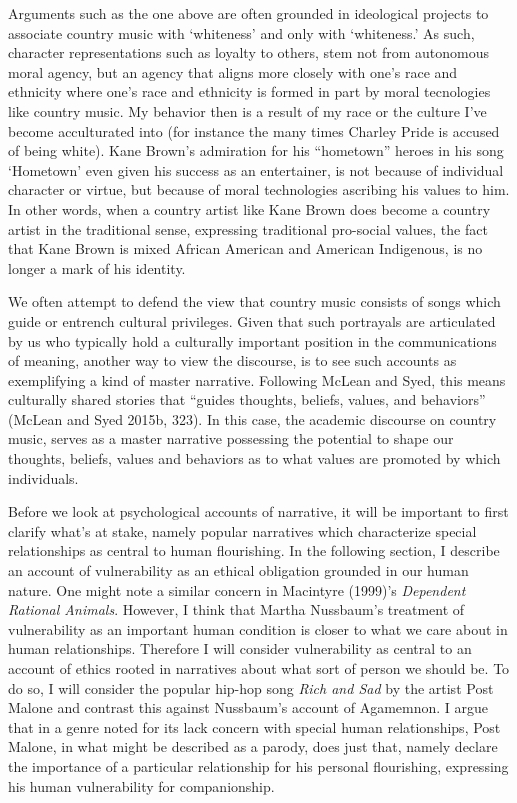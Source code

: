 \documentclass[12pt]{book}
\theoremstyle{definition}
\theoremstyle{remark}
\begin{document}
Arguments such as the one above are often grounded in ideological projects to associate country music with `whiteness' and only with `whiteness.' As such, character representations such as loyalty to others, stem not from autonomous moral agency, but an agency that aligns more closely with one's race and ethnicity where one's race and ethnicity is formed in part by moral tecnologies like country music. My behavior then is a result of my race or the culture I've become acculturated into (for instance the many times Charley Pride is accused of being white). Kane Brown's admiration for his ``hometown'' heroes in his song `Hometown' even given his success as an entertainer, is not because of individual character or virtue, but because of moral technologies ascribing his values to him. In other words, when a country artist like Kane Brown does become a country artist in the traditional sense, expressing traditional pro-social values, the fact that Kane Brown is mixed African American and American Indigenous, is no longer a mark of his identity.

We often attempt to defend the view that country music consists of songs which guide or entrench cultural privileges. Given that such portrayals are articulated by us who typically hold a culturally important position in the communications of meaning, another way to view the discourse, is to see such accounts as exemplifying a kind of master narrative. Following McLean and Syed, this means culturally shared stories that ``guides thoughts, beliefs, values, and behaviors'' (McLean and Syed 2015b, 323). In this case, the academic discourse on country music, serves as a master narrative possessing the potential to shape our thoughts, beliefs, values and behaviors as to what values are promoted by which individuals.

Before we look at psychological accounts of narrative, it will be important to first clarify what's at stake, namely popular narratives which characterize special relationships as central to human flourishing. In the following section, I describe an account of vulnerability as an ethical obligation grounded in our human nature. One might note a similar concern in Macintyre (1999)'s \emph{Dependent Rational Animals}. However, I think that Martha Nussbaum's treatment of vulnerability as an important human condition is closer to what we care about in human relationships. Therefore I will consider vulnerability as central to an account of ethics rooted in narratives about what sort of person we should be. To do so, I will consider the popular hip-hop song \emph{Rich and Sad} by the artist Post Malone and contrast this against Nussbaum's account of Agamemnon. I argue that in a genre noted for its lack concern with special human relationships, Post Malone, in what might be described as a parody, does just that, namely declare the importance of a particular relationship for his personal flourishing, expressing his human vulnerability for companionship.
\end{document}
